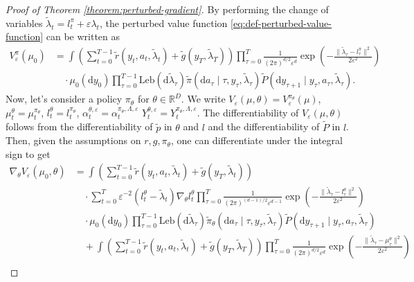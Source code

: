 \documentclass[11pt]{article}
\numberwithin{equation}{section}
\theoremstyle{definition}
\theoremstyle{remark}
\def\eps{\varepsilon}
\def\d{{\mathrm{d}}}
\def\R{{\mathbb R}}
\begin{document}
\begin{proof}[Proof of Theorem \ref{theorem:perturbed-gradient}]
By performing the change of variables $\tilde{\lambda}_t = l^\pi_t + \eps \lambda_t$, the perturbed value function \eqref{eq:def-perturbed-value-function} can be written as 
\[
\begin{aligned}
    V_{\eps}^{\pi}(\mu_0) &= \int \left(\sum_{t = 0}^{T - 1} \tilde r(y_t, a_t, \tilde \lambda_t) + \tilde g(y_T, \tilde \lambda_T) \right) \prod_{\tau= 0}^{T }\frac{1}{(2 \pi)^{d/2}\eps^{d}}\exp \left( - \frac{ \| \tilde \lambda_\tau - l_\tau^\pi \|^2}{2 \eps^{2}} \right) \\
    & \quad \cdot \mu_0(\d y_0) \prod_{\tau = 0}^{T - 1} \mathrm{Leb}(\d \tilde \lambda_\tau) \tilde \pi (\d a_\tau \mid \tau,y_\tau, \tilde \lambda_\tau) \tilde P (\d y_{\tau + 1} \mid y_\tau, a_\tau, \tilde{\lambda}_\tau).
\end{aligned}
\]
Now, let's consider a policy $\pi_\theta$ for $\theta \in \R^D$. We write $V_\eps(\mu,\theta) = V_\eps^{\pi_\theta}(\mu)$, $\mu_t^\theta = \mu_t^{\pi_\theta}$, $l_t^\theta = l_t^{\pi_\theta}$, $\alpha_t^{\theta, \eps} = \alpha_t^{\pi_{\theta}, \Lambda, \eps}$ $Y_t^{\theta,\eps} =Y_t^{\pi_{\theta},\Lambda, \eps} $.
The differentiability of $V_\eps(\mu, \theta)$ follows from the differentiability of $\tilde p$ in $\theta$ and $l$ and the differentiability of $\tilde P$ in $l$.
Then, given the assumptions on $r,g,\pi_\theta$, one can differentiate under the integral sign to get
\[
\begin{aligned}
    \nabla_\theta V_{\eps}(\mu_0, \theta) &= 
    \int \left(\sum_{t = 0}^{T - 1} \tilde r(y_t, a_t, \tilde \lambda_t) + \tilde g(y_T, \tilde \lambda_t) \right)  \\
    &\quad  \cdot \sum_{t = 0}^{T } \eps^{-2} (l_t^\theta - \tilde \lambda_t) \nabla_{\theta} l_t^\theta
    \prod_{\tau = 0}^{T} \frac{1}{(2 \pi)^{(d-1)/2}\eps^{d-1}}\exp \left( - \frac{\| \tilde \lambda_\tau -  l_\tau^\theta \|^2}{2 \eps^{2}} \right) \\
    & \quad  \cdot  \mu_0(\d y_0) \prod_{\tau = 0}^{T - 1} \mathrm{Leb}(\d \tilde \lambda_\tau) \tilde \pi_{\theta} (\d a_\tau \mid \tau,y_\tau, \tilde \lambda_\tau) \tilde P (\d y_{\tau + 1} \mid y_\tau, a_\tau, \tilde{\lambda}_\tau) \\
    &\quad + \int \left(\sum_{t = 0}^{T - 1} \tilde r(y_t, a_t, \tilde \lambda_t) + \tilde g(y_T, \tilde \lambda_T) \right)\prod_{\tau = 0}^{T} \frac{1}{(2 \pi)^{d/2}\eps^{d}}\exp \left( - \frac{ \| \tilde \lambda_\tau - \mu_\tau^\theta \|^2}{2 \eps^{2}} \right) \\

\end{aligned}\]
\end{proof}
\end{document}
